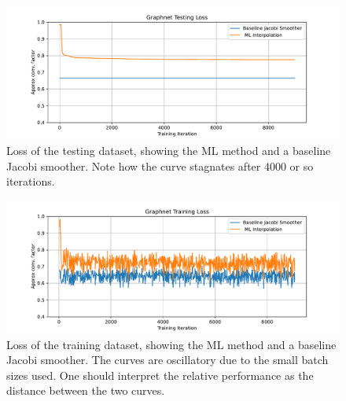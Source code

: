 \documentclass{article}
\begin{document}
\begin{figure}[h]
  \includegraphics[width=\textwidth]{figures/graphnet_testing_loss.pdf}
  \caption{Loss of the testing dataset, showing the ML method and a baseline Jacobi smoother.  Note how the curve stagnates after 4000 or so iterations.}
  \label{fig:loss_testing}
\end{figure}

\begin{figure}[h]
  \includegraphics[width=\textwidth]{figures/graphnet_training_loss.pdf}
  \caption{Loss of the training dataset, showing the ML method and a baseline Jacobi smoother.  The curves are oscillatory due to the small batch sizes used.  One should interpret the relative performance as the distance between the two curves.}
  \label{fig:loss_training}
\end{figure}
\end{document}
